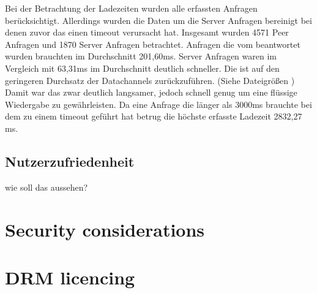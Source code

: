Bei der Betrachtung der Ladezeiten wurden alle erfassten Anfragen berücksichtigt. Allerdings wurden die Daten um die Server Anfragen bereinigt bei denen zuvor das \pTp \cdn einen timeout verursacht hat. Insgesamt wurden 4571 Peer Anfragen und 1870 Server Anfragen betrachtet. 
Anfragen die vom \pTp \cdn beantwortet wurden brauchten im Durchschnitt 201,60ms. Server Anfragen waren im Vergleich mit 63,31ms im Durchschnitt deutlich schneller. Die ist auf den geringeren Durchsatz der \webrtc Datachannels zurückzuführen. (Siehe Dateigrößen ) Damit war das \pTp \cdn zwar deutlich langsamer, jedoch schnell genug um eine flüssige Wiedergabe zu gewährleisten. Da eine Anfrage die länger als 3000ms brauchte bei dem \pTp \cdn zu einem timeout geführt hat betrug die höchste erfasste Ladezeit 2832,27 ms.    
\subsection{Nutzerzufriedenheit}
wie soll das aussehen?

\section{Security considerations}
\section{DRM licencing}
